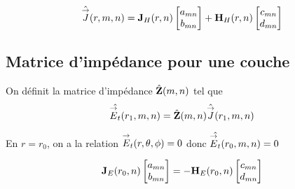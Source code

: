         \begin{equation}
            \hat{\vJ}(r,m,n) = 
            \mJ_{H}(r,n)
            \begin{bmatrix}
                a_{mn}
                \\
                b_{mn}
            \end{bmatrix}
            +
            \mH_{H}(r,n)
            \begin{bmatrix}
                c_{mn}
                \\
                d_{mn}
            \end{bmatrix}
        \end{equation}

    \subsection{Matrice d'impédance pour une couche}

        \begin{figure}[!hbt]
          \centering
          \begin{tikzpicture}
            
          \end{tikzpicture}
        \end{figure}

        \begin{defn}
          On définit la matrice d'impédance \(\hat{\mZ}(m,n)\) tel que
          \[
              \hat{\vE_t}(r_1,m,n) = \hat{\mZ}(m,n)\hat{\vJ}(r_1,m,n)
          \]
        \end{defn}

        En \(r=r_0\), on a la relation \(\vE_t(\rtp) = 0\) donc \(\hat{\vE_t}(r_0,m,n) = 0 \)

        \begin{equation}
            \mJ_{E}(r_0,n)
            \begin{bmatrix}
                a_{mn}
                \\
                b_{mn}
            \end{bmatrix}
            = -
            \mH_{E}(r_0,n)
            \begin{bmatrix}
                c_{mn}
                \\
                d_{mn}
            \end{bmatrix}
        \end{equation}

